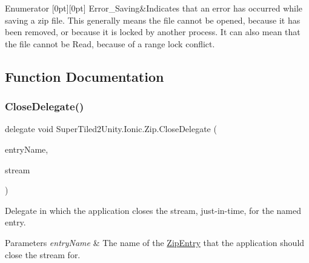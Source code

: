 \begin{DoxyEnumFields}{Enumerator}
[0pt][0pt]{}\mbox{\label{namespace_super_tiled2_unity_1_1_ionic_1_1_zip_a6584db8196e626ddfc455e74d31a841fa6d93d77ba4439ec2a5bf59f7282b906f}} 
Error\+\_\+\+Saving&Indicates that an error has occurred while saving a zip file. This generally means the file cannot be opened, because it has been removed, or because it is locked by another process. It can also mean that the file cannot be Read, because of a range lock conflict. \\
\hline

\end{DoxyEnumFields}


\subsection{Function Documentation}
\mbox{\label{namespace_super_tiled2_unity_1_1_ionic_1_1_zip_a19b625523fef0bcff4722ebb8a04b5d0}} 
\subsubsection{\texorpdfstring{Close\+Delegate()}{CloseDelegate()}}
{\footnotesize\ttfamily delegate void Super\+Tiled2\+Unity.\+Ionic.\+Zip.\+Close\+Delegate (\begin{DoxyParamCaption}\item[{string}]{entry\+Name,  }\item[{System.\+I\+O.\+Stream}]{stream }\end{DoxyParamCaption})}



Delegate in which the application closes the stream, just-\/in-\/time, for the named entry. 


\begin{DoxyParams}{Parameters}
{\em entry\+Name} & The name of the \mbox{\hyperlink{class_super_tiled2_unity_1_1_ionic_1_1_zip_1_1_zip_entry}{Zip\+Entry}} that the application should close the stream for. \\
\hline
\end{DoxyParams}



